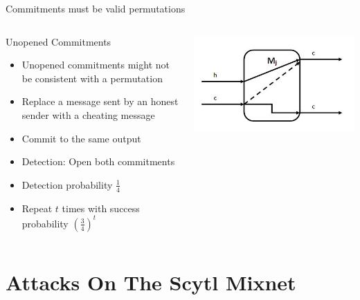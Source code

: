 \documentclass{beamer}
\begin{document}
\begin{frame}[allowframebreaks]{Commitments must be valid permutations}
\begin{columns}[onlytextwidth]
\begin{column}{0.6\textwidth}
Unopened Commitments
\begin{itemize}
\item Unopened commitments might not be consistent with a permutation
\item Replace a message sent by an honest sender with a cheating message
\item Commit to the same output
\item Detection: Open both commitments
\item Detection probability $\frac{1}{4}$
\item Repeat $t$ times with success probability $(\frac{3}{4})^t$
\end{itemize}
\end{column}

\begin{column}{0.4\textwidth}
\begin{center}
\includegraphics[scale=0.3]{rpc2.jpg}
\end{center}
\end{column}

\end{columns}

\end{frame}



\section{Attacks On The Scytl Mixnet}
\end{document}
